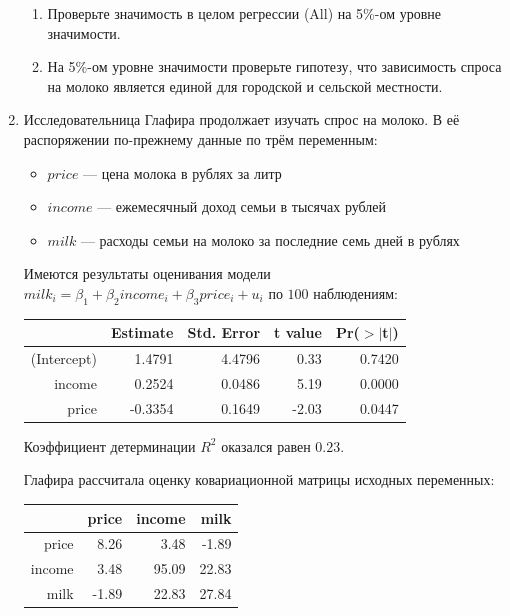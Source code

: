 \documentclass[12pt, a4paper]{article}\usepackage[]{graphicx}\usepackage[]{color}
\begin{document}
\begin{enumerate}
\begin{enumerate}
\item Проверьте значимость в целом регрессии (All) на 5\%-ом уровне значимости.
\item На 5\%-ом уровне значимости проверьте гипотезу, что зависимость спроса на молоко является единой для городской и сельской местности.
\end{enumerate}

\item Исследовательница Глафира продолжает изучать спрос на молоко. В её распоряжении по-прежнему данные по трём переменным:
\begin{itemize}
\item $price$ — цена молока в рублях за литр
\item $income$ — ежемесячный доход семьи в тысячах рублей
\item $milk$ — расходы семьи на молоко за последние семь дней в рублях
\end{itemize}

Имеются результаты оценивания модели $milk_i = \beta_1 + \beta_2 income_i + \beta_3 price_i + u_i$ по $100$ наблюдениям:
\begin{table}[ht]
\centering
\begin{tabular}{rrrrr}
  \hline
 & Estimate & Std. Error & t value & Pr($>$$|$t$|$) \\ 
  \hline
(Intercept) & 1.4791 & 4.4796 & 0.33 & 0.7420 \\ 
  income & 0.2524 & 0.0486 & 5.19 & 0.0000 \\ 
  price & -0.3354 & 0.1649 & -2.03 & 0.0447 \\ 
   \hline
\end{tabular}
\end{table}



Коэффициент детерминации $R^2$ оказался равен $0.23$.


Глафира рассчитала оценку ковариационной матрицы исходных переменных:
\begin{table}[ht]
\centering
\begin{tabular}{rrrr}
  \hline
 & price & income & milk \\ 
  \hline
price & 8.26 & 3.48 & -1.89 \\ 
  income & 3.48 & 95.09 & 22.83 \\ 
  milk & -1.89 & 22.83 & 27.84 \\ 
   \hline
\end{tabular}
\end{table}




\end{enumerate}
\end{document}
